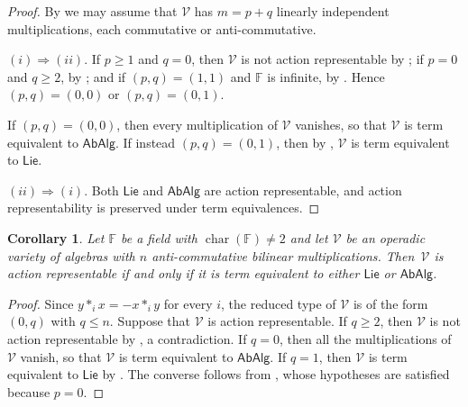 \documentclass[reqno,a4paper]{amsart}
\theoremstyle{plain}
\newtheorem{corollary}[subsection]{Corollary}
\theoremstyle{definition}
\theoremstyle{remark}
\numberwithin{equation}{section}
\newcommand{\F}{\mathbb{F}}
\newcommand{\V}{\mathcal{V}}
\DeclareMathOperator{\bchar}{char}
\newcommand{\Lie}{\ensuremath{\mathsf{Lie}}}
\newcommand{\AbAlg}{\ensuremath{\mathsf{AbAlg}}}
\begin{document}
\begin{proof}
By  we may assume that $\V$ has $m=p+q$ linearly independent multiplications, each commutative or anti-commutative.

$(i)\Rightarrow(ii)$. If $p\geq1$ and $q=0$, then $\V$ is not action representable by ; if $p=0$ and $q\geq2$, by ; and if $(p,q)=(1,1)$ and $\F$ is infinite, by . Hence $(p,q)=(0,0)$ or $(p,q)=(0,1)$.

If $(p,q)=(0,0)$, then every multiplication of $\V$ vanishes, so that $\V$ is term equivalent to $\AbAlg$. If instead $(p,q)=(0,1)$, then by , $\V$ is term equivalent to $\Lie$.

$(ii)\Rightarrow(i)$. Both $\Lie$ and $\AbAlg$ are action representable, and action representability is preserved under term equivalences.
\end{proof}

\begin{corollary}\label{CorAntiCommClassification}
Let $\F$ be a field with $\bchar(\F)\neq2$ and let $\V$ be an operadic variety of algebras with $n$ anti-commutative bilinear multiplications. Then~$\V$ is action representable if and only if it is term equivalent to either $\Lie$ or $\AbAlg$.
\end{corollary}

\begin{proof}
Since $y\ast_ix=-x\ast_iy$ for every $i$, the reduced type of $\V$ is of the form $(0,q)$ with $q\leq n$. Suppose that $\V$ is action representable. If $q\geq2$, then $\V$ is not action representable by , a contradiction. If $q=0$, then all the multiplications of $\V$ vanish, so that $\V$ is term equivalent to $\AbAlg$. If $q=1$, then $\V$ is term equivalent to $\Lie$ by . The converse follows from , whose hypotheses are satisfied because $p=0$.
\end{proof}
\end{document}
